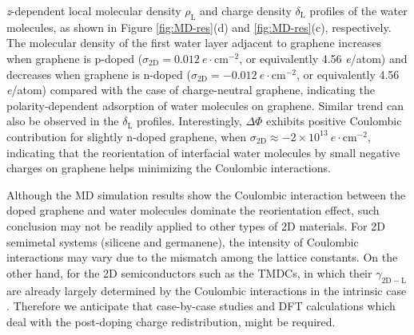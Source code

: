 \documentclass[journal=jacsat,manuscript=article,email=true]{achemso}
\begin{document}
\emph{z}-dependent local molecular density \(\rho_{\mathrm{L}}\) and charge
density \(\delta_{\mathrm{L}}\) profiles of the water molecules, as
shown in Figure \ref{fig:MD-res}(d) and \ref{fig:MD-res}(c),
respectively. The molecular density of the first water layer adjacent
to graphene increases when graphene is p-doped
(\(\sigma_{\mathrm{2D}}=0.012\ e\cdot \mathrm{cm}^{-2}\), or
equivalently 4.56 \textit{e}/atom) and decreases when graphene is
n-doped (\(\sigma_{\mathrm{2D}}=-0.012\ e\cdot \mathrm{cm}^{-2}\), or
equivalently 4.56 \textit{e}/atom) compared with the case of
charge-neutral graphene, indicating the polarity-dependent adsorption
of water molecules on graphene. Similar trend can also be observed in
the \(\delta_{\mathrm{L}}\) profiles. Interestingly, \(\Delta \Phi\)
exhibits positive Coulombic contribution for slightly n-doped
graphene, when \(\sigma_{\mathrm{2D}} \approx -2\times10^{13}\ e\cdot
\mathrm{cm}^{-2}\), indicating that the reorientation of interfacial
water molecules by small negative charges on graphene helps minimizing
the Coulombic interactions.
\begin{center}
\end{center}
Although the MD simulation results show the Coulombic interaction
between the doped graphene and water molecules dominate the
reorientation effect, such conclusion may not be readily applied to
other types of 2D materials. For 2D semimetal systems (silicene and
germanene), the intensity of Coulombic interactions may vary due to
the mismatch among the lattice constants. On the other hand, for the
2D semiconductors such as the TMDCs, in which their
\(\gamma_{\mathrm{2D-L}}\) are already largely determined by the
Coulombic interactions in the intrinsic case
\cite{Govind_Rajan_2016,Chow_2015}. Therefore we anticipate that
case-by-case studies and DFT calculations which deal with the
post-doping charge redistribution, might be required.
\begin{center}
\end{center}
\end{document}
